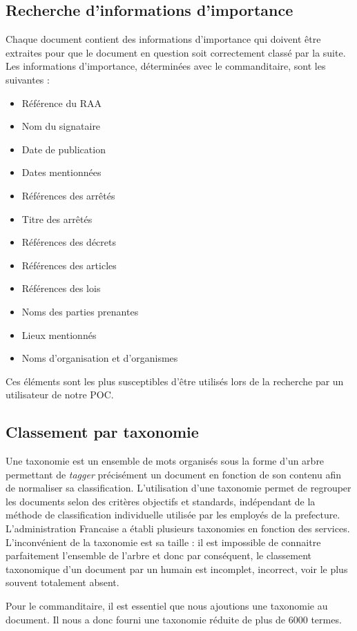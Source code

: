 \subsection{Recherche d'informations d'importance} 
Chaque document contient des informations d'importance qui doivent être extraites pour que le document en question soit correctement classé par la suite.
Les informations d'importance, déterminées avec le commanditaire, sont les suivantes :
\begin {itemize}
\item Référence du RAA
\item Nom du signataire
\item Date de publication
\item Dates mentionnées
\item Références des arrêtés
\item Titre des arrêtés
\item Références des décrets
\item Références des articles
\item Références des lois
\item Noms des parties prenantes
\item Lieux mentionnés
\item Noms d'organisation et d'organismes
\end {itemize}

Ces éléments sont les plus susceptibles d'être utilisés lors de la recherche par un utilisateur de notre POC.



\subsection{Classement par taxonomie}
Une taxonomie est un ensemble de mots organisés sous la forme d'un arbre permettant de \textit{tagger} précisément un document en fonction de son contenu afin de normaliser sa classification.
L'utilisation d'une taxonomie permet de regrouper les documents selon des critères objectifs et standards, indépendant de la méthode de classification individuelle utilisée par les employés de la prefecture.
L'administration Francaise a établi plusieurs taxonomies en fonction des services.
L'inconvénient de la taxonomie est sa taille : il est impossible de connaitre parfaitement l'ensemble de l'arbre et donc par conséquent, le classement taxonomique d'un document par un humain est incomplet, incorrect, voir le plus souvent totalement absent.

Pour le commanditaire, il est essentiel que nous ajoutions une taxonomie au document.
Il nous a donc fourni une taxonomie réduite de plus de 6000 termes.


